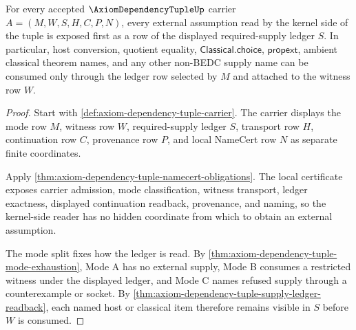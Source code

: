 \begin{theorem}
\label{thm:axiom-dependency-tuple-kernel-supply-visibility}
For every accepted $\AxiomDependencyTupleUp$ carrier
$A=(M,W,S,H,C,P,N)$, every external assumption read by the kernel side of the
tuple is exposed first as a row of the displayed required-supply ledger $S$.
In particular, host conversion, quotient equality,
$\mathsf{Classical.choice}$, $\mathsf{propext}$, ambient classical theorem
names, and any other non-BEDC supply name can be consumed only through the
ledger row selected by $M$ and attached to the witness row $W$.
\end{theorem}
\begin{proof}
Start with \autoref{def:axiom-dependency-tuple-carrier}. The carrier displays
the mode row $M$, witness row $W$, required-supply ledger $S$, transport row
$H$, continuation row $C$, provenance row $P$, and local NameCert row $N$ as
separate finite coordinates.

Apply \autoref{thm:axiom-dependency-tuple-namecert-obligations}. The local
certificate exposes carrier admission, mode classification, witness transport,
ledger exactness, displayed continuation readback, provenance, and naming, so
the kernel-side reader has no hidden coordinate from which to obtain an
external assumption.

The mode split fixes how the ledger is read. By
\autoref{thm:axiom-dependency-tuple-mode-exhaustion}, Mode A has no external
supply, Mode B consumes a restricted witness under the displayed ledger, and
Mode C names refused supply through a counterexample or socket. By
\autoref{thm:axiom-dependency-tuple-supply-ledger-readback}, each named host or
classical item therefore remains visible in $S$ before $W$ is consumed.
\end{proof}

